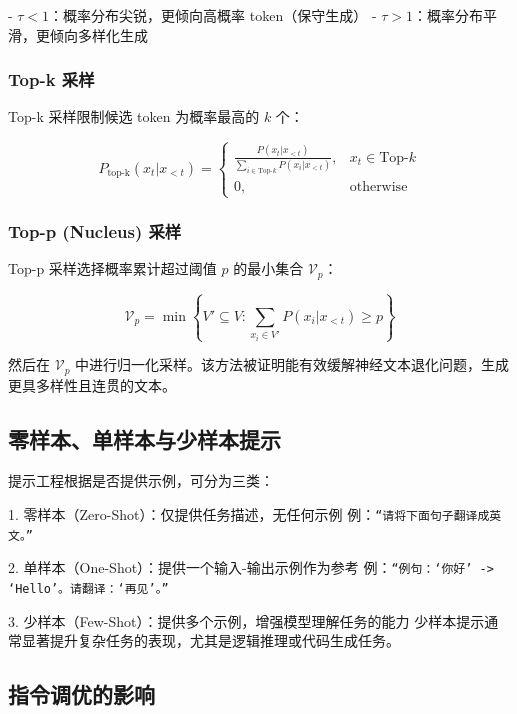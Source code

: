 \documentclass[professional,privacy,print,win,long,STEM,AutoFakeBold]{def/buaa}
\begin{document}
- $\tau < 1$：概率分布尖锐，更倾向高概率 token（保守生成）  
- $\tau > 1$：概率分布平滑，更倾向多样化生成

\subsubsection{Top-k 采样}

Top-k 采样限制候选 token 为概率最高的 $k$ 个：

\begin{equation}
P_\text{top-k}(x_t|x_{<t}) =
\begin{cases}
\frac{P(x_t|x_{<t})}{\sum_{i \in \text{Top-}k} P(x_i|x_{<t})}, & x_t \in \text{Top-}k \\
0, & \text{otherwise}
\end{cases}
\end{equation}

\subsubsection{Top-p (Nucleus) 采样}

Top-p 采样选择概率累计超过阈值 $p$ 的最小集合 $\mathcal{V}_p$：

\begin{equation}
\mathcal{V}_p = \min \left\{ V' \subseteq V : \sum_{x_i \in V'} P(x_i|x_{<t}) \ge p \right\}
\end{equation}

然后在 $\mathcal{V}_p$ 中进行归一化采样。该方法被证明能有效缓解神经文本退化问题，生成更具多样性且连贯的文本。


\subsection{零样本、单样本与少样本提示}

提示工程根据是否提供示例，可分为三类：

1. 零样本（Zero-Shot）：仅提供任务描述，无任何示例  
   例：\texttt{“请将下面句子翻译成英文。”}

2. 单样本（One-Shot）：提供一个输入-输出示例作为参考  
   例：\texttt{“例句：‘你好’ -> ‘Hello’。请翻译：‘再见’。”}

3. 少样本（Few-Shot）：提供多个示例，增强模型理解任务的能力  
   少样本提示通常显著提升复杂任务的表现，尤其是逻辑推理或代码生成任务。


\subsection{指令调优的影响}
\end{document}
